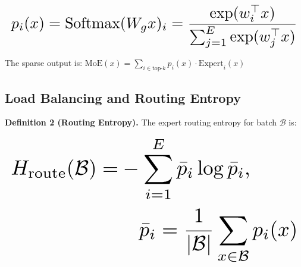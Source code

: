 \documentclass[11pt,a4paper]{article}
\begin{document}
\begin{equation}
\resizebox{\columnwidth}{!}{$\displaystyle
\begin{aligned}
p_i(x) = \text{Softmax}(W_g x)_i = \frac{\exp(w_i^\top x)}{\sum_{j=1}^E \exp(w_j^\top x)}
\end{aligned}
$}
\end{equation}



























The sparse output is: $\text{MoE}(x) = \sum_{i \in \text{top-}k} p_i(x) \cdot \text{Expert}_i(x)$


\subsection{Load Balancing and Routing Entropy}


\textbf{Definition 2 (Routing Entropy).} The expert routing entropy for batch $\mathcal{B}$ is:



























\begin{equation}
\resizebox{\columnwidth}{!}{$\displaystyle
\begin{aligned}
H_{\text{route}}(\mathcal{B}) = & -\sum_{i=1}^E \bar{p}_i \log \bar{p}_i, \\
& \quad \bar{p}_i = \frac{1}{|\mathcal{B}|}\sum_{x \in \mathcal{B}} p_i(x)
\end{aligned}
$}
\end{equation}
\end{document}
